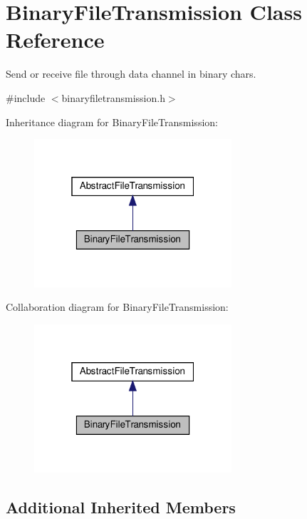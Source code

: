 \hypertarget{classBinaryFileTransmission}{}\section{Binary\+File\+Transmission Class Reference}
\label{classBinaryFileTransmission}


Send or receive file through data channel in binary chars.  




{\ttfamily \#include $<$binaryfiletransmission.\+h$>$}



Inheritance diagram for Binary\+File\+Transmission\+:\nopagebreak
\begin{figure}[H]
\begin{center}
\leavevmode
\includegraphics[width=208pt]{d0/d38/classBinaryFileTransmission__inherit__graph}
\end{center}
\end{figure}


Collaboration diagram for Binary\+File\+Transmission\+:\nopagebreak
\begin{figure}[H]
\begin{center}
\leavevmode
\includegraphics[width=208pt]{da/d1d/classBinaryFileTransmission__coll__graph}
\end{center}
\end{figure}
\subsection*{Additional Inherited Members}


